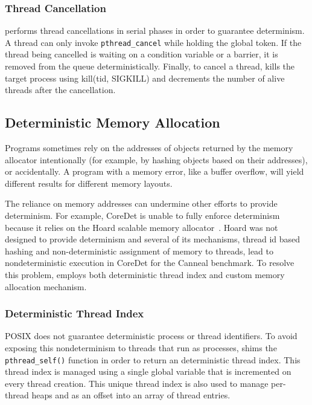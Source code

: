 \subsubsection{Thread Cancellation}

\dthreads{} performs thread cancellations in serial phases in order to guarantee determinism. A thread can only invoke \texttt{pthread\_cancel} while holding the global token. If the thread being cancelled is waiting on a condition variable or a barrier, it is removed from the queue deterministically. Finally, to cancel a thread, \dthreads{} kills the target process using kill(tid, SIGKILL) and decrements the number of alive threads after the cancellation.

\subsection{Deterministic Memory Allocation}
Programs sometimes rely on the addresses of objects returned by the memory allocator intentionally (for example, by hashing objects based on their addresses), or accidentally. A program with a memory error, like a buffer overflow, will yield different results for different memory layouts.

The reliance on memory addresses can undermine other efforts to provide determinism. For example, CoreDet is unable to fully enforce determinism because it relies on the Hoard scalable memory allocator~\cite{Bergan:2010:CCR:1736020.1736029}. Hoard was not designed to provide determinism and several of its mechanisms, thread id based hashing and non-deterministic assignment of memory to threads, lead to nondeterministic execution in CoreDet for the Canneal benchmark. To resolve this problem, \dthreads{} employs both deterministic thread index and custom memory allocation mechanism. 

\subsubsection{Deterministic Thread Index}
\label{sec:threadindex}

POSIX does not guarantee deterministic process or thread identifiers. To avoid exposing this nondeterminism to threads that run as processes, \dthreads{} shims the \texttt{pthread\_self()} function in order to return an deterministic thread index.  This thread index is managed using a single global variable that is incremented on every thread creation.  This unique thread index is also used to manage per-thread heaps and as an offset into an array of thread entries.

